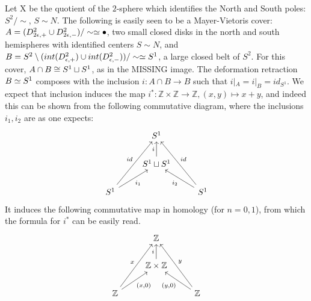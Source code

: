 \begin{example}
Let X be the quotient of the $2$-sphere which identifies the North and South poles: $S^2/\sim$, $S \sim N$. The following is easily seen to be a Mayer-Vietoris cover: $A=(D^2_{2\epsilon,+}\cup D^2_{2\epsilon,-})/\sim\simeq \bullet$, two small closed disks in the north and south hemispheres with identified centers $S\sim N$, and $B=S^2\setminus(int(D^2_{\epsilon,+}) \cup int(D^2_{\epsilon,-}))/\sim \simeq S^1$, a large closed belt of $S^2$. For this cover, $A\cap B \cong S^1\sqcup S^1$, as in the MISSING image. The deformation retraction $B\simeq S^1$ composes with the inclusion $i:A\cap B\rightarrow B$ such that $i|_A=i|_B =id_{S^1}$. We expect that inclusion induces the map $i^*:\mathbb{Z}\times \mathbb{Z}\rightarrow \mathbb{Z}, (x,y)\mapsto x+y$, and indeed this can be shown from the following commutative diagram, where the inclusions $i_1,i_2$ are as one expects:
\[\begin{tikzcd}
                                         & S^1                           &                                          \\
                                         & S^1 \sqcup S^1 \arrow[u, "i"] &                                          \\
S^1 \arrow[ru, "i_1"'] \arrow[ruu, "id"] &                               & S^1 \arrow[lu, "i_2"] \arrow[luu, "id"']
\end{tikzcd}\]
It induces the following commutative map in homology (for $n=0,1$), from which the formula for $i^*$ can be easily read. 
\[\begin{tikzcd}
                                                   & \mathbb{Z}                                 &                                                    \\
                                                   & \mathbb{Z}\times \mathbb{Z} \arrow[u, "i"] &                                                    \\
\mathbb{Z} \arrow[ru, "{(x,0)}"'] \arrow[ruu, "x"] &                                            & \mathbb{Z} \arrow[lu, "{(y,0)}"] \arrow[luu, "y"']
\end{tikzcd}\]


\end{example}
